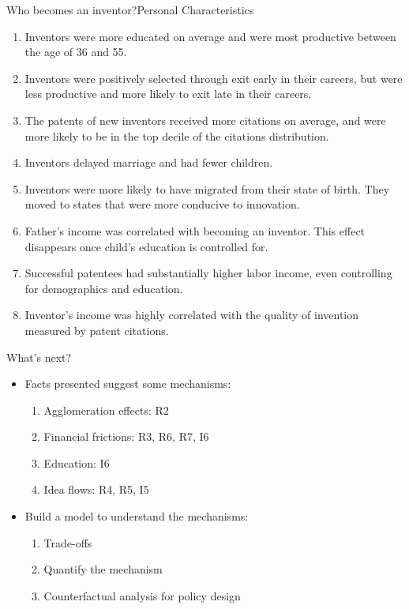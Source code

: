 \documentclass[usenames,dvipsnames,aspectratio=169]{beamer}
\begin{document}
\begin{frame}[allowframebreaks]{Who becomes an inventor?}{Personal Characteristics}
\begin{enumerate}[label=\textcolor{teal}{I\arabic*.}]
\vfill
\item Inventors were more educated on average and were most productive between the age of 36 and 55.
\vfill
\item Inventors were positively selected through exit early in their careers, but were less productive and more likely to exit late in their careers.
\vfill
\item The patents of new inventors received more citations on average, and were more likely to be in the top decile of the citations distribution.
\vfill
\item Inventors delayed marriage and had fewer children.
\vfill

\framebreak

\vfill
\item Inventors were more likely to have migrated from their state of birth. They moved to states that were more conducive to innovation.
\vfill
\item Father's income was correlated with becoming an inventor. This effect disappears once child's education is controlled for.
\vfill
\item Successful patentees had substantially higher labor income, even controlling for demographics and education.
\vfill
\item Inventor's income was highly correlated with the quality of invention measured by patent citations.
\vfill
\end{enumerate}
\end{frame}

\begin{frame}{What's next?}
\begin{itemize}[label=\textcolor{teal}{$\blacktriangleright$}]
\vfill
\item Facts presented suggest some mechanisms:
\begin{enumerate}[label=\textcolor{teal}{\textbf{(\arabic*.)}}]
\item Agglomeration effects: R2
\item Financial frictions: R3, R6, R7, I6
\item Education: I6
\item Idea flows: R4, R5, I5
\end{enumerate}
\vfill
\item Build a model to understand the mechanisms:
\begin{enumerate}[label=\textcolor{teal}{\textbf{(\arabic*.)}}]
\item Trade-offs
\item Quantify the mechanism
\item Counterfactual analysis for policy design 
\end{enumerate}
\vfill
\end{itemize}

\end{frame}
\end{document}
